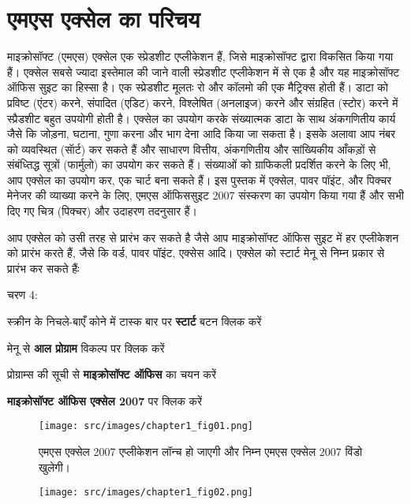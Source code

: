 \chapter{एमएस एक्सेल का परिचय}

माइक्रोसॉफ्ट (एमएस) एक्सेल एक स्प्रेडशीट एप्लीकेशन हैं, जिसे माइक्रोसॉफ्ट द्वारा विकसित किया गया हैं। एक्सेल सबसे ज्यादा इस्तेमाल की जाने वाली स्प्रेडशीट एप्लीकेशन में से एक है और यह माइक्रोसॉफ्ट ऑफिस सुइट का हिस्सा है। एक स्प्रेडशीट मूलतः रो और कॉलमो की एक मैट्रिक्स होती हैं। डाटा को प्रविष्ट (एंटर) करने, संपादित (एडिट) करने, विश्लेषित (अनलाइज) करने और संग्रहित (स्टोर) करने में स्प्रैडशीट बहुत उपयोगी होती है। एक्सेल का उपयोग करके संख्यात्मक डाटा के साथ अंकगणितीय कार्य जैसे कि जोड़ना, घटाना, गुणा करना और भाग देना आदि किया जा सकता है। इसके अलावा आप नंबर को व्यवस्थित (सॅार्ट) कर सकते हैं और साधारण वित्तीय, अंकगणितीय और सांख्यिकीय आँकड़ों से संबंध्तिद्ध सूत्रों (फार्मुलो) का उपयोग कर सकते हैं। संख्याओं को ग्राफिकली प्रदर्शित करने के लिए भी, आप एक्सेल का उपयोग कर, एक चार्ट बना सकते हैं। इस पुस्तक में एक्सेल, पावर पॉइंट, और पिक्चर मेनेजर की व्याख्या करने के लिए, एमएस ऑफिससुइट 2007 संस्करण का उपयोग किया गया हैं और सभी दिए गए चित्र (पिक्चर) और उदाहरण तदनुसार हैं।

आप एक्सेल को उसी तरह से प्रारंभ कर सकते है जैसे आप माइक्रोसॉफ्ट ऑफिस सुइट में हर एप्लीकेशन को प्रारंभ करते हैं, जैसे कि वर्ड, पावर पॉइंट, एक्सेस आदि। एक्सेल को स्टार्ट मेनू से निम्न प्रकार से प्रारंभ कर सकते हैंः

\begin{descriptionSimple}{चरण 4:}
\item[चरण 1] स्क्रीन के निचले-बाएँ कोने में टास्क बार पर \textbf{स्टार्ट} बटन क्लिक करें
\item[चरण 2] मेनू से \textbf{आल प्रोग्राम} विकल्प पर क्लिक करें
\item[चरण 3] प्रोग्राम्स की सूची से \textbf{माइक्रोसॉफ्ट ऑफिस} का चयन करें
\item[चरण 4] \textbf{माइक्रोसॉफ्ट ऑफिस एक्सेल 2007} पर क्लिक करें
\end{descriptionSimple}
\newpage

\begin{figure}[H]
\centering
\texttt{[image: src/images/chapter1\_fig01.png]}
\caption{एमएस एक्सेल 2007 एप्लीकेशन लॉन्च हो जाएगी और निम्न एमएस एक्सेल 2007 विंडो खुलेगी।}\label{chap1_fig1}
\end{figure}

\begin{figure}[H]
\centering
\texttt{[image: src/images/chapter1\_fig02.png]}
\end{figure}

